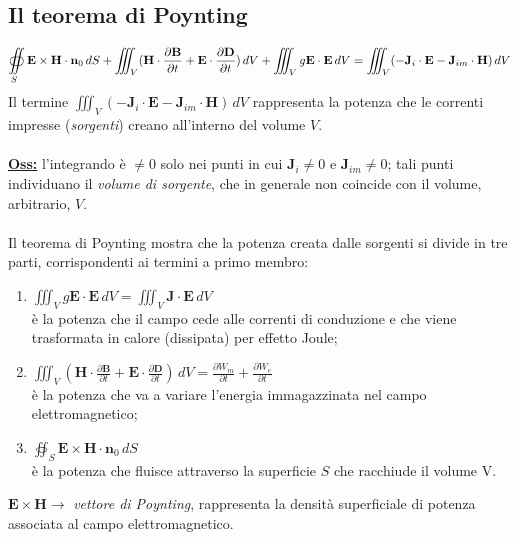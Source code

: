 \documentclass[a4paper]{article}
\begin{document}
\subsection*{Il teorema di Poynting}
\begin{equation*}
\oiint_{S}\textbf{E}\times\textbf{H}\cdot\textbf{n}_0\,dS+\iiint_{V}(\textbf{H}\cdot\frac{\partial\textbf{B}}{\partial t}+\textbf{E}\cdot\frac{\partial\textbf{D}}{\partial t})\,dV+\iiint_{V}g\textbf{E}\cdot\textbf{E}\,dV=\iiint_{V}(-\textbf{J}_i\cdot\textbf{E}-\textbf{J}_{im}\cdot\textbf{H})\,dV\\\\
\end{equation*}
Il termine $\iiint_{V}(-\textbf{J}_i\cdot\textbf{E}-\textbf{J}_{im}\cdot\textbf{H})\,dV$ rappresenta la potenza che le correnti impresse (\emph{sorgenti}) creano all'interno del volume $V$.\\\\
\underline{\textbf{Oss:}} l'integrando è $\neq0$ solo nei punti in cui $\textbf{J}_i\neq0$ e $\textbf{J}_{im}\neq0$; tali punti individuano il \emph{volume di sorgente}, che in generale non coincide con il volume, arbitrario, $V$.\\\\
Il teorema di Poynting mostra che la potenza creata dalle sorgenti si divide in tre parti, corrispondenti ai termini a primo membro:
\begin{enumerate}
\item $\iiint_{V}g\textbf{E}\cdot\textbf{E}\,dV=\iiint_{V}\textbf{J}\cdot\textbf{E}\,dV$\\
è la potenza che il campo cede alle correnti di conduzione e che viene trasformata in calore (dissipata) per effetto Joule;
\item $\iiint_{V}(\textbf{H}\cdot\frac{\partial\textbf{B}}{\partial t}+\textbf{E}\cdot\frac{\partial\textbf{D}}{\partial t})\,dV=\frac{\partial W_m}{\partial t}+\frac{\partial W_e}{\partial t}$\\
è la potenza che va a variare l'energia immagazzinata nel campo elettromagnetico;
\item $\oiint_{S}\textbf{E}\times\textbf{H}\cdot\textbf{n}_0\,dS$\\
è la potenza che fluisce attraverso la superficie $S$ che racchiude il volume V.
\end{enumerate}
$\textbf{E}\times\textbf{H}\rightarrow$ \emph{vettore di Poynting}, rappresenta la densità superficiale di potenza associata al campo elettromagnetico.\\\\
\end{document}
